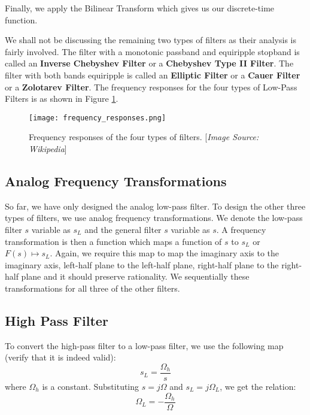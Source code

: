 \documentclass{article}
\theoremstyle{definition}
\begin{document}
Finally, we apply the Bilinear Transform which gives us our discrete-time function. \medskip

We shall not be discussing the remaining two types of filters as their analysis is fairly involved. The filter with a monotonic passband and equiripple stopband is called an \textbf{Inverse Chebyshev Filter} or a \textbf{Chebyshev Type II Filter}. The filter with both bands equiripple is called an \textbf{Elliptic Filter} or a \textbf{Cauer Filter} or a \textbf{Zolotarev Filter}. The frequency responses for the four types of Low-Pass Filters is as shown in Figure \ref{fig:freq_rep}.

\begin{figure}[h!]
\centering
\texttt{[image: frequency\_responses.png]}
\caption{Frequency responses of the four types of filters. [\textit{Image Source: Wikipedia}]}
\label{fig:freq_rep}
\end{figure}	 

\subsection{Analog Frequency Transformations}

So far, we have only designed the analog low-pass filter. To design the other three types of filters, we use analog frequency transformations. We denote the low-pass filter $s$ variable as $s_L$ and the general filter $s$ variable as $s$. A frequency transformation is then a function which maps a function of $s$ to $s_L$ or $F(s) \longmapsto s_L$. Again, we require this map to map the imaginary axis to the imaginary axis, left-half plane to the left-half plane, right-half plane to the right-half plane and it should preserve rationality. We sequentially these transformations for all three of the other filters.

\subsection{High Pass Filter}

To convert the high-pass filter to a low-pass filter, we use the following map (verify that it is indeed valid):
\[
    s_L = \frac{\Omega_h}{s}
\]  
where $\Omega_h$ is a constant. Substituting $s = j\Omega$ and $s_L = j \Omega_L$, we get the relation:
\[
    \boxed{\Omega_L = - \frac{\Omega_h}{\Omega}}
\]
\end{document}
